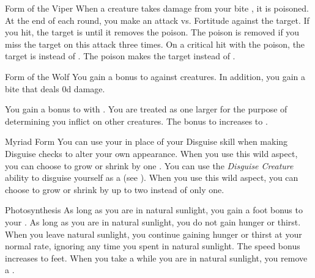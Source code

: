 {\begin{freeability}{Form of the Viper}
                \rankline
                 When a creature takes damage from your bite , it is poisoned.
                At the end of each round, you make an attack vs. Fortitude against the target.
                If you hit, the target is  until it removes the poison.
                The poison is removed if you miss the target on this attack three times.
                 On a critical hit with the poison, the target is  instead of .
                 The poison makes the target  instead of .
            \end{freeability}

            \begin{freeability}{Form of the Wolf}
                You gain a  bonus to  against  creatures.
                In addition, you gain a bite  that deals \plus0d damage.

                \rankline
                 You gain a  bonus to  with .
                 You are treated as one  larger for the purpose of determining  you inflict on other creatures.
                 The bonus to  increases to .
            \end{freeability}

            \begin{freeability}{Myriad Form}
                You can use your  in place of your Disguise skill when making Disguise checks to alter your own appearance.
                \rankline
                 When you use this wild aspect, you can choose to grow or shrink by one .
                 You can use the \textit{Disguise Creature} ability to disguise yourself as a  (see ).
                 When you use this wild aspect, you can choose to grow or shrink by up to two  instead of only one.
            \end{freeability}

            \begin{freeability}{Photosynthesis}
                As long as you are in natural sunlight, you gain a  foot bonus to your .
                \rankline
                 As long as you are in natural sunlight, you do not gain hunger or thirst.
                When you leave natural sunlight, you continue gaining hunger or thirst at your normal rate, ignoring any time you spent in natural sunlight.
                 The speed bonus increases to  feet.
                 When you take a  while you are in natural sunlight, you remove a .
            \end{freeability}

}
